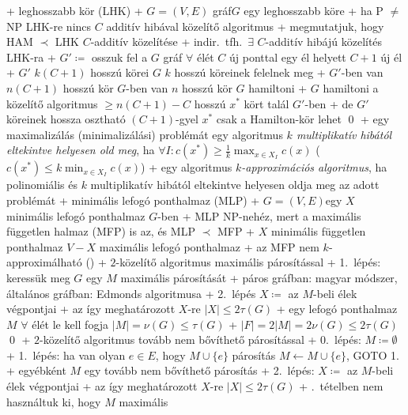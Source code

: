 + \prob leghosszabb kör (LHK)
  + \DataIn $G = (V, E)$ gráf\qquad\DataOut $G$ egy leghosszabb köre
  + \thm ha P $\ne$ NP \RA LHK-re nincs $C$ additív hibával
    közelítő algoritmus
    + \proof megmutatjuk, hogy HAM $\prec$ LHK $C$-additív közelítése
    + indir.~tfh.~$\exists$ $C$-additív hibájú közelítés LHK-ra
    + $G' \coloneqq$ osszuk fel a $G$ gráf $\forall$ élét $C$ új
      ponttal \RA egy él helyett $C + 1$ új él
    + $G'$ $k (C + 1)$ hosszú körei $G$ $k$ hosszú köreinek felelnek meg
    + $G'$-ben van $n (C + 1)$ hosszú kör \LRA $G$-ben van $n$ hosszú
      kör \LRA $G$ hamiltoni
    + $G$ hamiltoni \RA a közelítő algoritmus $\ge n (C + 1) - C$
      hosszú $x^*$ kört talál $G'$-ben
      + de $G'$ köreinek hossza osztható $(C + 1)$-gyel \RA $x^*$
        csak a Hamilton-kör lehet \qed
+ \dfn egy maximalizálás (minimalizálási) problémát egy algoritmus
  \emph{$k$ multiplikatív hibától eltekintve helyesen old meg}, ha
  $\forall I : c(x^*) \ge \frac{1}{k} \max_{x \in X_I} c(x)$
  ($c(x^*) \le k \min_{x \in X_I} c(x)$)
+ \dfn egy algoritmus \emph{$k$-approximációs algoritmus}, ha
  polinomiális és $k$ multiplikatív hibától eltekintve helyesen oldja
  meg az adott problémát
+ \prob minimális lefogó ponthalmaz (MLP)
  + \DataIn $G = (V, E)$\qquad\DataOut egy $X$ minimális lefogó ponthalmaz
    $G$-ben
  + MLP NP-nehéz, mert a maximális független halmaz (MFP) is az, és
    MLP $\prec$ MFP
    + $X$ minimális független ponthalmaz \LRA $V - X$ maximális lefogó
      ponthalmaz
    + az MFP nem $k$-approximálható (\noproof)
  + \alg $2$-közelítő algoritmus maximális párosítással
    + 1.~lépés: keressük meg $G$ egy $M$ maximális párosítását
      + páros gráfban: magyar módszer, általános gráfban: Edmonds
        algoritmusa
    + 2.~lépés $X \coloneqq$ az $M$-beli élek végpontjai
    + \thm \label{thm:kozelito:multi:lefogo1}az így meghatározott $X$-re $\lvert X \rvert \le 2 \tau(G)$
      + \proof egy lefogó ponthalmaz $M$ $\forall$ élét le kell fogja
        \RA $\lvert M \rvert = \nu(G) \le \tau(G)$
      + $\lvert F \rvert = 2 \lvert M \rvert = 2 \nu(G) \le 2 \tau(G)$
        \qed
  + \alg $2$-közelítő algoritmus tovább nem bővíthető párosítással
    + 0.~lépés: $M \coloneqq \emptyset$
    + 1.~lépés: ha van olyan $e \in E$, hogy $M \cup \{e\}$ párosítás
      \RA $M \gets M \cup \{e\}$, GOTO 1.
      + egyébként $M$ egy tovább nem bővíthető párosítás
    + 2.~lépés: $X \coloneqq$ az $M$-beli élek végpontjai
    + \thm az így meghatározott $X$-re $\lvert X \rvert \le 2 \tau(G)$
      + \proof {}.~tételben nem
        használtuk ki, hogy $M$ maximális
